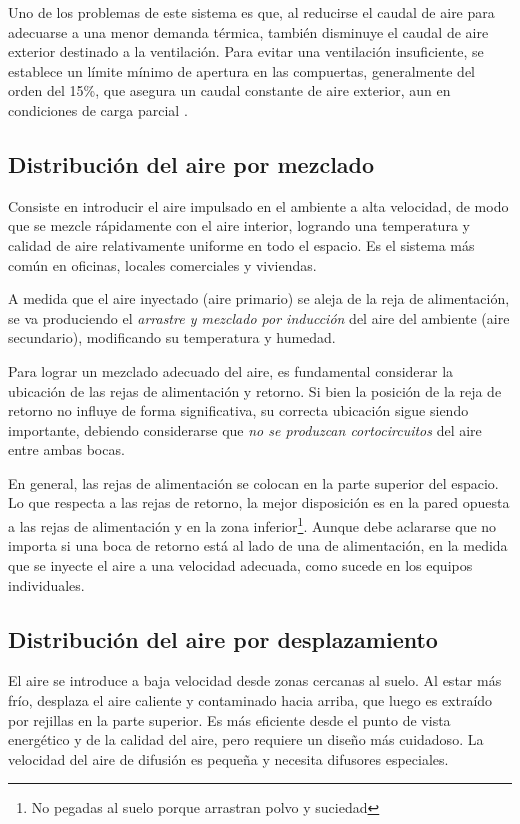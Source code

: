 Uno de los problemas de este sistema es que, al reducirse el caudal de aire para adecuarse a una menor demanda térmica, también disminuye el caudal de aire exterior destinado a la ventilación. Para evitar una ventilación insuficiente, se establece un límite mínimo de apertura en las compuertas, generalmente del orden del 15\%, que asegura un caudal constante de aire exterior, aun en condiciones de carga parcial \parencite{quadri2020instalaciones}.

\subsection{Distribución del aire por mezclado}

Consiste en introducir el aire impulsado en el ambiente a alta velocidad, de modo que se mezcle rápidamente con el aire interior, logrando una temperatura y calidad de aire relativamente uniforme en todo el espacio. Es el sistema más común en oficinas, locales comerciales y viviendas. 

A medida que el aire inyectado (aire primario) se aleja de la reja de alimentación, se va produciendo el \emph{arrastre y mezclado por inducción} del aire del ambiente (aire secundario), modificando su temperatura y humedad.


Para lograr un mezclado adecuado del aire, es fundamental considerar la ubicación de las rejas de alimentación y retorno. Si bien la posición de la reja de retorno no influye de forma significativa, su correcta ubicación sigue siendo importante, debiendo considerarse que \emph{no se produzcan cortocircuitos} del aire entre ambas bocas.


En general, las rejas de alimentación se colocan en la parte superior del espacio. Lo que respecta a las rejas de retorno, la mejor disposición es en la pared opuesta a las rejas de alimentación y en la zona inferior\footnote{No pegadas al suelo porque arrastran polvo y suciedad}. Aunque debe aclararse que no importa si una boca de retorno está al lado de una de alimentación, en la medida que se inyecte el aire a una velocidad adecuada, como sucede en los equipos individuales.

\subsection{Distribución del aire por desplazamiento}
El aire se introduce a baja velocidad desde zonas cercanas al suelo. Al estar más frío, desplaza el aire caliente y contaminado hacia arriba, que luego es extraído por rejillas en la parte superior. Es más eficiente desde el punto de vista energético y de la calidad del aire, pero requiere un diseño más cuidadoso. La velocidad del aire de difusión es pequeña y necesita difusores especiales.

